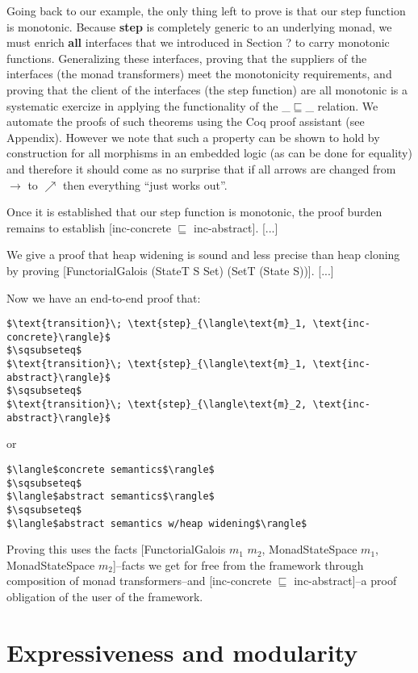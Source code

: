 \documentclass{article}
\begin{document}
Going back to our example, the only thing left to prove is that our step
function is monotonic.
%
Because \textbf{step} is completely generic to an underlying monad, we must
enrich \textbf{all} interfaces that we introduced in Section ? to carry
monotonic functions.
%
Generalizing these interfaces, proving that the suppliers of the interfaces
(the monad transformers) meet the monotonicity requirements, and proving that
the client of the interfaces (the step function) are all monotonic is a
systematic exercize in applying the functionality of the \_$\sqsubseteq$\_
relation.
%
We automate the proofs of such theorems using the Coq proof assistant (see
Appendix).
%
However we note that such a property can be shown to hold by construction for
all morphisms in an embedded logic (as can be done for equality) and therefore
it should come as no surprise that if all arrows are changed from $\to$ to
$\nearrow$ then everything ``just works out''.

Once it is established that our step function is monotonic, the proof burden
remains to establish [inc-concrete $\sqsubseteq$ inc-abstract]. [...]

We give a proof that heap widening is sound and less precise than heap cloning
by proving [FunctorialGalois (StateT S Set) (SetT (State S))]. [...]

Now we have an end-to-end proof that:
\begin{lstlisting}[mathescape]
$\text{transition}\; \text{step}_{\langle\text{m}_1, \text{inc-concrete}\rangle}$
$\sqsubseteq$
$\text{transition}\; \text{step}_{\langle\text{m}_1, \text{inc-abstract}\rangle}$
$\sqsubseteq$
$\text{transition}\; \text{step}_{\langle\text{m}_2, \text{inc-abstract}\rangle}$
\end{lstlisting}
or
\begin{lstlisting}[mathescape]
$\langle$concrete semantics$\rangle$
$\sqsubseteq$
$\langle$abstract semantics$\rangle$
$\sqsubseteq$
$\langle$abstract semantics w/heap widening$\rangle$
\end{lstlisting}
%
Proving this uses the facts [FunctorialGalois $m_1$ $m_2$, MonadStateSpace
$m_1$, MonadStateSpace $m_2$]--facts we get for free from the framework through
composition of monad transformers--and [inc-concrete $\sqsubseteq$
inc-abstract]--a proof obligation of the user of the framework.


\section{Expressiveness and modularity}
\end{document}
